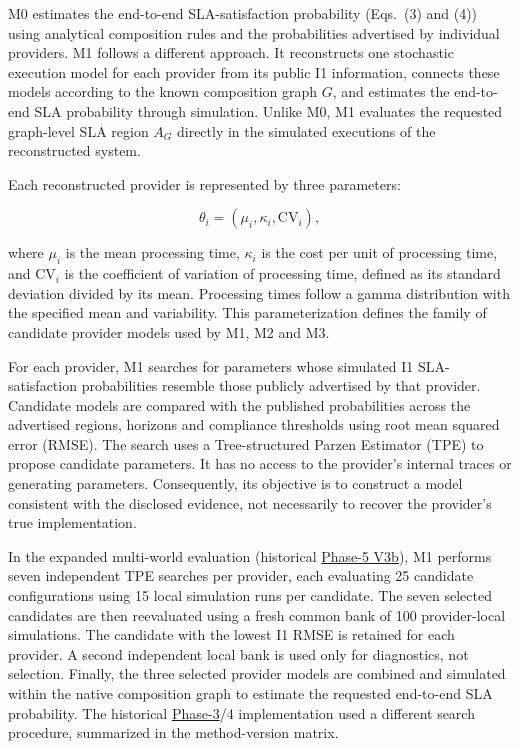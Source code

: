 \documentclass[10pt,a4paper]{article}
\begin{document}
M0 estimates the end-to-end SLA-satisfaction probability (Eqs.~(3) and (4)) using analytical composition rules and the probabilities advertised by individual providers. M1 follows a different approach. It reconstructs one stochastic execution model for each provider from its public I1 information, connects these models according to the known composition graph $G$, and estimates the end-to-end SLA probability through simulation. Unlike M0, M1 evaluates the requested graph-level SLA region $A_G$ directly in the simulated executions of the reconstructed system.

Each reconstructed provider is represented by three parameters:

\begin{equation*}
\theta_i=(\mu_i,\kappa_i,\mathrm{CV}_i),
\tag{9}
\end{equation*}

where $\mu_i$ is the mean processing time, $\kappa_i$ is the cost per unit of processing time, and $\mathrm{CV}_i$ is the coefficient of variation of processing time, defined as its standard deviation divided by its mean. Processing times follow a gamma distribution with the specified mean and variability. This parameterization defines the family of candidate provider models used by M1, M2 and M3.

For each provider, M1 searches for parameters whose simulated I1 SLA-satisfaction probabilities resemble those publicly advertised by that provider. Candidate models are compared with the published probabilities across the advertised regions, horizons and compliance thresholds using root mean squared error (RMSE). The search uses a Tree-structured Parzen Estimator (TPE) to propose candidate parameters. It has no access to the provider's internal traces or generating parameters. Consequently, its objective is to construct a model consistent with the disclosed evidence, not necessarily to recover the provider's true implementation.

In the expanded multi-world evaluation (historical \hyperref[app:experiment-stages]{Phase-5 V3b}), M1 performs seven independent TPE searches per provider, each evaluating 25 candidate configurations using 15 local simulation runs per candidate. The seven selected candidates are then reevaluated using a fresh common bank of 100 provider-local simulations. The candidate with the lowest I1 RMSE is retained for each provider. A second independent local bank is used only for diagnostics, not selection. Finally, the three selected provider models are combined and simulated within the native composition graph to estimate the requested end-to-end SLA probability. The historical \hyperref[app:experiment-stages]{Phase-3}/4 implementation used a different search procedure, summarized in the method-version matrix.
\end{document}
